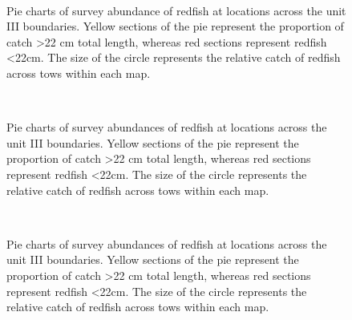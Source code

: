 \documentclass[11pt]{article}
\newcommand{\D}{.}
\newcommand{\e}{/home/ecomod_data/redfish/figures/}
\begin{document}
\begin{landscape}
\begin{figure}
\centering
{}
\\
\caption{Pie charts of survey abundance of redfish at locations across the unit III boundaries. Yellow sections of the pie represent the proportion of catch \textgreater 22 cm total length, whereas red sections represent redfish \textless 22cm. The size of the circle represents the relative catch of redfish across tows within each map. }
\end{figure}
\clearpage


\begin{figure}
\centering

\\
\caption{Pie charts of survey abundances of redfish at locations across the unit III boundaries. Yellow sections of the pie represent the proportion of catch \textgreater 22 cm total length, whereas red sections represent redfish \textless 22cm. The size of the circle represents the relative catch of redfish across tows within each map.}

\end{figure}

\begin{figure}
\centering

\\
\caption{Pie charts of survey abundances of redfish at locations across the unit III boundaries. Yellow sections of the pie represent the proportion of catch \textgreater 22 cm total length, whereas red sections represent redfish \textless 22cm. The size of the circle represents the relative catch of redfish across tows within each map.}

\end{figure}
\end{landscape}
\clearpage
\end{document}
